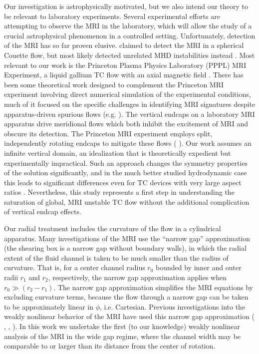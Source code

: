 \documentclass{emulateapj}
\newcommand{\citei}[1]{\citeauthor{#1} \citeyear{#1}}
\begin{document}
Our investigation is astrophysically motivated, but we also intend our theory to be relevant to laboratory experiments. Several experimental efforts are attempting to observe the MRI in the laboratory, which will allow the study of a crucial astrophysical phenomenon in a controlled setting. Unfortunately, detection of the MRI has so far proven elusive. \citei{Sisan:2004ig} claimed to detect the MRI in a spherical Couette flow, but most likely detected unrelated MHD instabilities instead \citep{Hollerbach:2009ig,Gissinger:2011td}. Most relevant to our work is the Princeton Plasma Physics Laboratory (PPPL) MRI Experiment, a liquid gallium TC flow with an axial magnetic field \citep{Ji:2001kd}. There has been some theoretical work designed to complement the Princeton MRI experiment involving direct numerical simulation of the experimental conditions, much of it focused on the specific challenges in identifying MRI signatures despite apparatus-driven spurious flows (e.g. \citei{Gissinger:2012gc}). The vertical endcaps on a laboratory MRI apparatus drive meridional flows which both inhibit the excitement of MRI and obscure its detection. The Princeton MRI experiment employs split, independently rotating endcaps to mitigate these flows (\citei{Schartman:2009df}). Our work assumes an infinite vertical domain, an idealization that is theoretically expedient but experimentally impractical. Such an approach changes the symmetry properties of the solution significantly, and in the much better studied hydrodynamic case this leads to significant differences even for TC devices with very large aspect ratios \citep{Lopez:2005}. Nevertheless, this study represents a first step in understanding the saturation of global, MRI unstable TC flow without the additional complication of vertical endcap effects.

Our radial treatment includes the curvature of the flow in a cylindrical apparatus. Many investigations of the MRI use the ``narrow gap'' approximation (the shearing box is a narrow gap without boundary walls), in which the radial extent of the fluid channel is taken to be much smaller than the radius of curvature. That is, for a center channel radius $r_0$ bounded by inner and outer radii $r_1$ and $r_2$, respectively, the narrow gap approximation applies when $r_0 \gg (r_2 - r_1)$. The narrow gap approximation simplifies the MRI equations by excluding curvature terms, because the flow through a narrow gap can be taken to be approximately linear in $\phi$, i.e. Cartesian. Previous investigations into the weakly nonlinear behavior of the MRI have used this narrow gap approximation (\citei{Umurhan:2007dz}, \citei{Umurhan:2007hs}, \citei{Clark:2016}). In this work we undertake the first (to our knowledge) weakly nonlinear analysis of the MRI in the wide gap regime, where the channel width may be comparable to or larger than its distance from the center of rotation.
\end{document}
